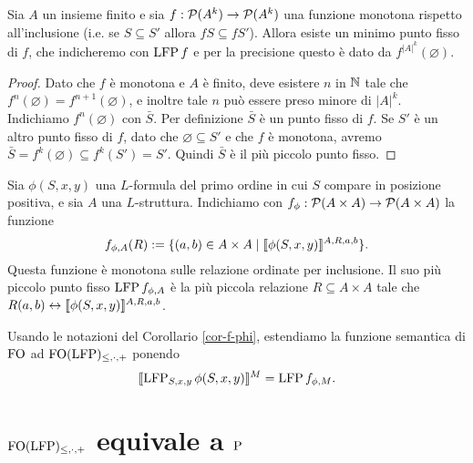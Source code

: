 \begin{teorema}
\label{teo-tarski-knaster}
 Sia $A$ un insieme finito e sia $f: \powerset(A^k) \to \powerset(A^k)$ una
 funzione monotona rispetto all'inclusione
 (i.e. se $S \subseteq S'$ allora $f S \subseteq f S'$). Allora esiste un minimo
 punto fisso di $f$, che indicheremo con $\LFP f$ e per la precisione
 questo è dato da $f^{|A|^k}(\varnothing)$.
\end{teorema}

\begin{proof}
 Dato che $f$ è monotona e $A$ è finito, deve esistere $n$ in $\N$ tale che
 $f^n(\varnothing) = f^{n+1}(\varnothing)$, e inoltre tale $n$ può essere preso
 minore di $|A|^k$. Indichiamo $f^n(\varnothing)$ con $\bar{S}$.
 Per definizione $\bar{S}$ è un punto fisso di $f$.
 Se $S'$ è un altro punto fisso di $f$, dato che $\varnothing \subseteq S'$ e
 che $f$ è monotona, avremo $\bar{S} = f^k(\varnothing) \subseteq f^k(S') = S'$.
 Quindi $\bar{S}$ è il più piccolo punto fisso.
\end{proof}

\begin{corollario}
\label{cor-f-phi}
 Sia $\phi(S,x,y)$ una $L$-formula del primo ordine in cui $S$ compare in posizione
 positiva, e sia $A$ una $L$-struttura.
 Indichiamo con $f_\phi: \powerset (A \times A) \to \powerset (A\times A)$ la funzione
 \[ f_{\phi,A}(R) := \{ (a,b) \in A \times A \mid \semantic{ \phi (S,x,y)}^{A,R,a,b} \}. \]
 Questa funzione è monotona sulle relazione ordinate per inclusione.
 Il suo più piccolo punto fisso $\LFP f_{\phi,A}$ è la più piccola relazione
 $R \subseteq A \times A$ tale che $R(a,b) \leftrightarrow \semantic{\phi(S,x,y)}^{A,R,a,b}$.
\end{corollario}

\begin{definizione}
 Usando le notazioni del Corollario \ref{cor-f-phi}, estendiamo la funzione
 semantica di $\FO$ ad $\FOLFP$ ponendo
 \[\semantic{\LFP_{S,x,y} \phi(S,x,y)}^M = \LFP f_{\phi,M}.\]
\end{definizione}

\section{\texorpdfstring{$\FOLFP$}{FO(LFP)} equivale a \texorpdfstring{$\P$}{P}}

